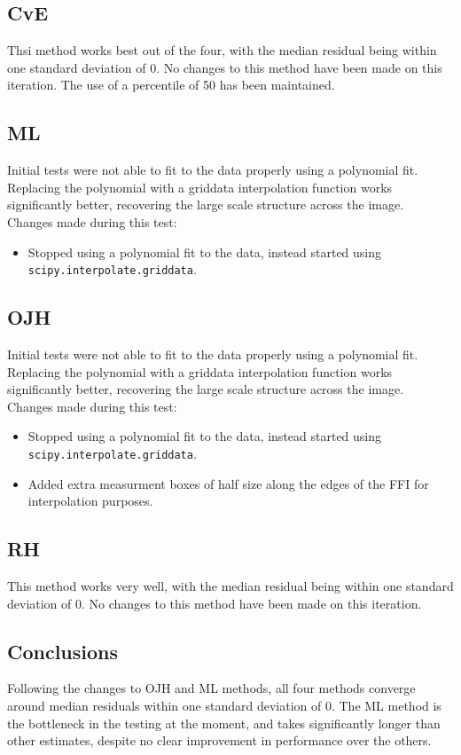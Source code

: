 \documentclass[10pt, a4paper]{article}
\begin{document}
\subsection{CvE}
Thsi method works best out of the four, with the median residual being within one standard deviation of 0. No changes to this method have been made on this iteration. The use of a percentile of 50 has been maintained.

\subsection{ML}
Initial tests were not able to fit to the data properly using a polynomial fit. Replacing the polynomial with a griddata interpolation function works significantly better, recovering the large scale structure across the image.\\
Changes made during this test:
\begin{itemize}
\item Stopped using a polynomial fit to the data, instead started using \texttt{scipy.interpolate.griddata}.
\end{itemize}

\subsection{OJH}
Initial tests were not able to fit to the data properly using a polynomial fit. Replacing the polynomial with a griddata interpolation function works significantly better, recovering the large scale structure across the image.\\

Changes made during this test:
\begin{itemize}
\item Stopped using a polynomial fit to the data, instead started using \texttt{scipy.interpolate.griddata}.
\item Added extra measurment boxes of half size along the edges of the FFI for interpolation purposes.
\end{itemize}

\subsection{RH}
This method works very well, with the median residual being within one standard deviation of 0. No changes to this method have been made on this iteration.

\subsection{Conclusions}
Following the changes to OJH and ML methods, all four methods converge around median residuals within one standard deviation of 0. The ML method is the bottleneck in the testing at the moment, and takes significantly longer than other estimates, despite no clear improvement in performance over the others.\\
\end{document}
